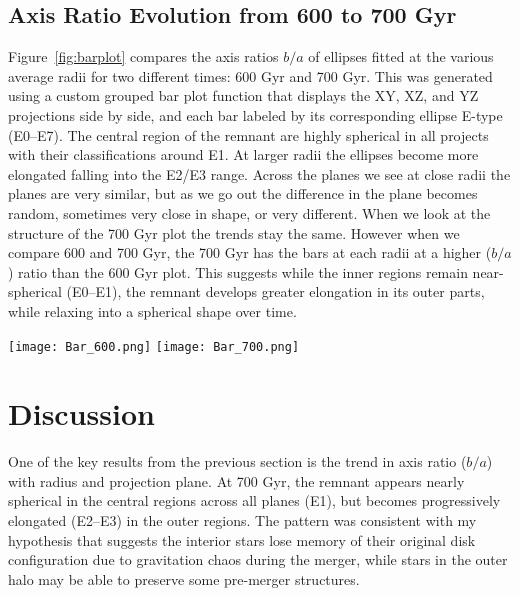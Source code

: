 \documentclass[usenatbib]{mnras}
\begin{document}
\subsection{Axis Ratio Evolution from 600 to 700 Gyr}

Figure~\ref{fig:barplot} compares the axis ratios $b/a$ of ellipses fitted at the various average radii for two different times: 600 Gyr and 700 Gyr. This was generated using a custom grouped bar plot function that displays the XY, XZ, and YZ projections side by side, and each bar labeled by its corresponding ellipse E-type (E0–E7). The central region of the remnant are highly spherical in all projects with their classifications around E1. At larger radii the ellipses become more elongated falling into the E2/E3 range. Across the planes we see at close radii the planes are very similar, but as we go out the difference in the plane becomes random, sometimes very close in shape, or very different. When we look at the structure of the 700 Gyr plot the trends stay the same. However when we compare 600 and 700 Gyr, the 700 Gyr has the bars at each radii at a higher ($b/a$) ratio than the 600 Gyr plot. This suggests while the inner regions remain near-spherical (E0–E1), the remnant develops greater elongation in its outer parts, while relaxing into a spherical shape over time. 

\begin{figure*}
    \centering
    \texttt{[image: Bar\_600.png]}
    \texttt{[image: Bar\_700.png]}
    \caption{
    \textbf{Axis Ratio $b/a$ vs. Radius for 600 Gyr (left) and 700 Gyr (right).}
    Each bar represents the axis ratio of a fitted ellipse in a given projection plane: XY (gold), XZ (pink), and YZ (purple). 
    Bars are grouped by average radius (x-axis), and labeled by E-type classification (E0–E7) based on $b/a$ values.
    Outer contours in the YZ plane show increasing elongation over time, reflecting gradual evolution in the vertical structure of the remnant.
    }
    \label{fig:barplot}
\end{figure*}

\section{Discussion}

One of the key results from the previous section is the trend in axis ratio ($b/a$) with radius and projection plane. At 700 Gyr, the remnant appears nearly spherical in the central regions across all planes (E1), but becomes progressively elongated (E2–E3) in the outer regions. The pattern was consistent with my hypothesis that suggests the interior stars lose memory of their original disk configuration due to gravitation chaos during the merger, while stars in the outer halo may be able to preserve some pre-merger structures.
\end{document}
